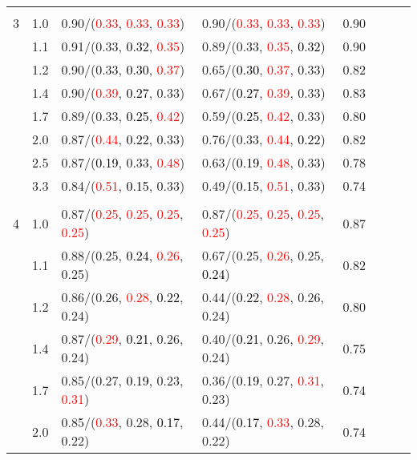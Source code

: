\documentclass[10pt,a4paper]{report}
\begin{document}
\begin{table}[!htbp]
\begin{center}
{\begin{tabular}{ccllcccc}
			&&&&\\
			3			&1.0&0.90/(\textcolor{red}{0.33}, \textcolor{red}{0.33}, \textcolor{red}{0.33})&0.90/(\textcolor{red}{0.33}, \textcolor{red}{0.33}, \textcolor{red}{0.33})&0.90\\
			&1.1&0.91/(0.33, \textcolor{black}{0.32}, \textcolor{red}{0.35})&0.89/(0.33, \textcolor{red}{0.35}, \textcolor{black}{0.32})&0.90\\
			&1.2&0.90/(0.33, \textcolor{black}{0.30}, \textcolor{red}{0.37})&0.65/(\textcolor{black}{0.30}, \textcolor{red}{0.37}, 0.33)&0.82\\
			&1.4&0.90/(\textcolor{red}{0.39}, \textcolor{black}{0.27}, 0.33)&0.67/(\textcolor{black}{0.27}, \textcolor{red}{0.39}, 0.33)&0.83\\
			&1.7&0.89/(0.33, \textcolor{black}{0.25}, \textcolor{red}{0.42})&0.59/(\textcolor{black}{0.25}, \textcolor{red}{0.42}, 0.33)&0.80\\
			&2.0&0.87/(\textcolor{red}{0.44}, \textcolor{black}{0.22}, 0.33)&0.76/(0.33, \textcolor{red}{0.44}, \textcolor{black}{0.22})&0.82\\
			&2.5&0.87/(\textcolor{black}{0.19}, 0.33, \textcolor{red}{0.48})&0.63/(\textcolor{black}{0.19}, \textcolor{red}{0.48}, 0.33)&0.78\\
			&3.3&0.84/(\textcolor{red}{0.51}, \textcolor{black}{0.15}, 0.33)&0.49/(\textcolor{black}{0.15}, \textcolor{red}{0.51}, 0.33)&0.74\\
			&&&&\\
			4			&1.0&0.87/(\textcolor{red}{0.25}, \textcolor{red}{0.25}, \textcolor{red}{0.25}, \textcolor{red}{0.25})&0.87/(\textcolor{red}{0.25}, \textcolor{red}{0.25}, \textcolor{red}{0.25}, \textcolor{red}{0.25})&0.87\\
			&1.1&0.88/(0.25, \textcolor{black}{0.24}, \textcolor{red}{0.26}, 0.25)&0.67/(0.25, \textcolor{red}{0.26}, 0.25, \textcolor{black}{0.24})&0.82\\
			&1.2&0.86/(0.26, \textcolor{red}{0.28}, \textcolor{black}{0.22}, 0.24)&0.44/(\textcolor{black}{0.22}, \textcolor{red}{0.28}, 0.26, 0.24)&0.80\\
			&1.4&0.87/(\textcolor{red}{0.29}, \textcolor{black}{0.21}, 0.26, 0.24)&0.40/(\textcolor{black}{0.21}, 0.26, \textcolor{red}{0.29}, 0.24)&0.75\\
			&1.7&0.85/(0.27, \textcolor{black}{0.19}, 0.23, \textcolor{red}{0.31})&0.36/(\textcolor{black}{0.19}, 0.27, \textcolor{red}{0.31}, 0.23)&0.74\\
			&2.0&0.85/(\textcolor{red}{0.33}, 0.28, \textcolor{black}{0.17}, 0.22)&0.44/(\textcolor{black}{0.17}, \textcolor{red}{0.33}, 0.28, 0.22)&0.74\\

\end{tabular}}
\end{center}
\end{table}
\end{document}
